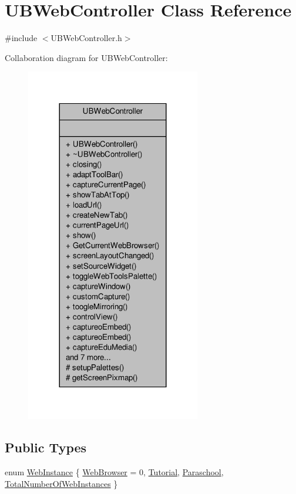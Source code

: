 \hypertarget{class_u_b_web_controller}{\section{U\-B\-Web\-Controller Class Reference}
\label{df/d50/class_u_b_web_controller}
}


{\ttfamily \#include $<$U\-B\-Web\-Controller.\-h$>$}



Collaboration diagram for U\-B\-Web\-Controller\-:
\nopagebreak
\begin{figure}[H]
\begin{center}
\leavevmode
\includegraphics[width=216pt]{d4/d89/class_u_b_web_controller__coll__graph}
\end{center}
\end{figure}
\subsection*{Public Types}
\begin{DoxyCompactItemize}
\item 
enum \hyperlink{class_u_b_web_controller_a39111fb6c022df143222a82026175f7e}{Web\-Instance} \{ \hyperlink{class_u_b_web_controller_a39111fb6c022df143222a82026175f7ea373ad368e9c8f796c07a81a886ae227a}{Web\-Browser} =  0, 
\hyperlink{class_u_b_web_controller_a39111fb6c022df143222a82026175f7ea12eaa8f560b3413cad96c00e315b79f4}{Tutorial}, 
\hyperlink{class_u_b_web_controller_a39111fb6c022df143222a82026175f7ea2ee95cc8b14b6de3a773a21ea9f5173a}{Paraschool}, 
\hyperlink{class_u_b_web_controller_a39111fb6c022df143222a82026175f7ea5380769fecb4471f529bbcd0ec26603a}{Total\-Number\-Of\-Web\-Instances}
 \}
\end{DoxyCompactItemize}
